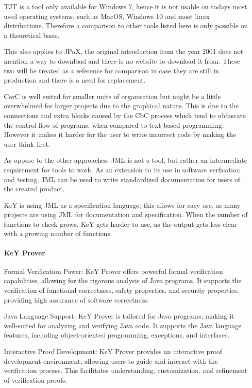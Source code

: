 
TJT is a tool only available for Windows 7, hence it is not usable on todays most used operating systems, such as MacOS, Windows 10 and most linux distributions. Therefore a comparison to other tools listed here is only possible on a theoretical basis.
 
This also applies to JPaX, the original introduction from the year 2001 does not mention a way to download and there is no website to download it from. 
These two will be treated as a reference for comparison in case they are still in production and there is a need for replacement.

CorC is well suited for smaller units of organisation but might be a little overwhelmed for larger projects due to the graphical nature. This is due to the connections and extra blocks caused by the CbC process which tend to obfuscate the control flow of programs, when compared to text-based programming. However it makes it harder for the user to write incorrect code by making the user think first.

As oppose to the other approaches, JML is not a tool, but rather an intermediate requirement for tools to work. As an extension to its use in software verfication and testing,  JML can be used to write standardized documentation for users of the created product.
 
KeY is using JML as a specification language, this allows for easy use, as many projects are using JML for documentation and specification. When the number of functions to check grows, KeY gets harder to use, as the output gets less clear with a growing number of functions. 
\paragraph{KeY Prover}
Formal Verification Power: KeY Prover offers powerful formal verification capabilities, allowing for the rigorous analysis of Java programs. It supports the verification of functional correctness, safety properties, and security properties, providing high assurance of software correctness.

Java Language Support: KeY Prover is tailored for Java programs, making it well-suited for analyzing and verifying Java code. It supports the Java language features, including object-oriented programming, exceptions, and interfaces.

Interactive Proof Development: KeY Prover provides an interactive proof development environment, allowing users to guide and interact with the verification process. This facilitates understanding, customization, and refinement of verification proofs.

